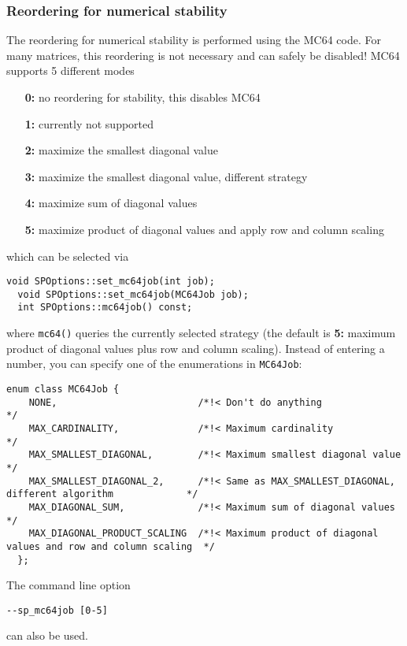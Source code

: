 \documentclass{article}
\begin{document}
\subsubsection{Reordering for numerical stability}\label{sec::mc64}
The reordering for numerical stability is performed using the MC64
code. For many matrices, this reordering is not necessary and can
safely be disabled! MC64 supports 5 different modes
{\small \begin{itemize}
\item[\textbf{0:}] no reordering for stability, this disables MC64
\item[\textbf{1:}] currently not supported
\item[\textbf{2:}] maximize the smallest diagonal value
\item[\textbf{3:}] maximize the smallest diagonal value, different strategy
\item[\textbf{4:}] maximize sum of diagonal values
\item[\textbf{5:}] maximize product of diagonal values and apply row and column scaling
\end{itemize}}
which can be selected via
\begin{lstlisting}[style=C]
  void SPOptions::set_mc64job(int job);
  void SPOptions::set_mc64job(MC64Job job);
  int SPOptions::mc64job() const;
\end{lstlisting}
where \lstinline[style=C]!mc64()! queries the currently selected
strategy (the default is \textbf{5:} maximum product of diagonal
values plus row and column scaling). Instead of entering a number, you
can specify one of the enumerations in \lstinline[style=C]!MC64Job!:
\begin{lstlisting}[style=C]
  enum class MC64Job {
    NONE,                         /*!< Don't do anything                                              */
    MAX_CARDINALITY,              /*!< Maximum cardinality                                            */
    MAX_SMALLEST_DIAGONAL,        /*!< Maximum smallest diagonal value                                */
    MAX_SMALLEST_DIAGONAL_2,      /*!< Same as MAX_SMALLEST_DIAGONAL, different algorithm             */
    MAX_DIAGONAL_SUM,             /*!< Maximum sum of diagonal values                                 */
    MAX_DIAGONAL_PRODUCT_SCALING  /*!< Maximum product of diagonal values and row and column scaling  */
  };
\end{lstlisting}
The command line option
\begin{lstlisting}[style=Bash]
  --sp_mc64job [0-5]
\end{lstlisting}
can also be used.
\end{document}

